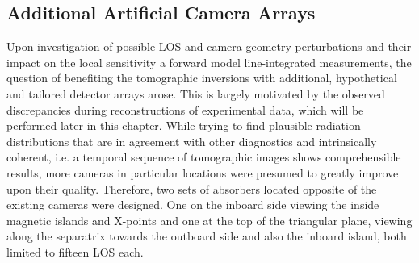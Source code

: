         \subsection{Additional Artificial Camera Arrays}\label{subsec:artf}%
%
           Upon investigation of possible LOS and camera geometry perturbations and their impact on the local sensitivity a forward model line-integrated measurements, the question of benefiting the tomographic inversions with additional, hypothetical and tailored detector arrays arose. This is largely motivated by the observed discrepancies during reconstructions of experimental data, which will be performed later in this chapter. While trying to find plausible radiation distributions that are in agreement with other diagnostics and intrinsically coherent, i.e. a temporal sequence of tomographic images shows comprehensible results, more cameras in particular locations were presumed to greatly improve upon their quality. Therefore, two sets of absorbers located opposite of the existing cameras were designed. One on the inboard side viewing the inside magnetic islands and X-points and one at the top of the triangular plane, viewing along the separatrix towards the outboard side and also the inboard island, both limited to fifteen LOS each.%
%
